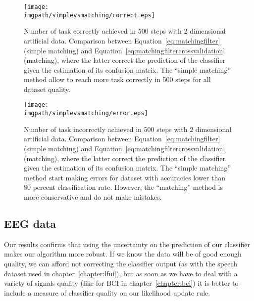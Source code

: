\begin{figure}[!ht]
\centering
\texttt{[image: \\imgpath/simplevsmatching/correct.eps]}
\caption{Number of task correctly achieved in 500 steps with 2 dimensional artificial data. Comparison between Equation~\ref{eq:matchingfilter} (simple matching) and Equation~\ref{eq:matchingfiltercrossvalidation} (matching), where the latter correct the prediction of the classifier given the estimation of its confusion matrix. The ``simple matching'' method allow to reach more task correctly in 500 steps for all dataset quality.
}
\label{fig:nCorrect_simplevsmatching}
\end{figure} 

\begin{figure}[!ht]
\centering
\texttt{[image: \\imgpath/simplevsmatching/error.eps]}
\caption{Number of task incorrectly achieved in 500 steps with 2 dimensional artificial data. Comparison between Equation~\ref{eq:matchingfilter} (simple matching) and Equation~\ref{eq:matchingfiltercrossvalidation} (matching), where the latter correct the prediction of the classifier given the estimation of its confusion matrix. The ``simple matching'' method start making errors for dataset with accuracies lower than 80 percent classification rate. However, the ``matching'' method is more conservative and do not make mistakes.}
\label{fig:nWrongEEG_simplevsmatching}
\end{figure} 



\subsection{EEG data}


\transition

Our results confirms that using the uncertainty on the prediction of our classifier makes our algorithm more robust. If we know the data will be of good enough quality, we can afford not correcting the classifier output (as with the speech dataset used in chapter~\ref{chapter:lfui}), but as soon as we have to deal with a variety of signals quality (like for BCI in chapter~\ref{chapter:bci}) it is better to include a measure of classifier quality on our likelihood update rule.